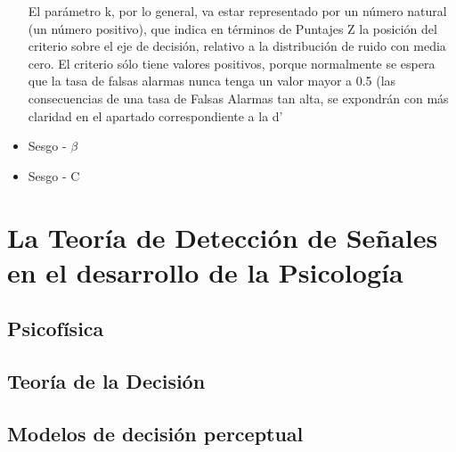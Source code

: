 \begin{itemize}
 El parámetro k, por lo general, va estar representado por un número natural (un número positivo), que indica en términos de Puntajes Z  la posición del criterio sobre el eje de decisión, relativo a la distribución de ruido con media cero. El criterio sólo tiene valores positivos, porque normalmente se espera que la tasa de falsas alarmas nunca tenga un valor mayor a 0.5 (las consecuencias de una tasa de Falsas Alarmas tan alta, se expondrán con más claridad en el apartado correspondiente a la d’


\item Sesgo - $\beta$


\item Sesgo - C


\end{itemize}


\section{La Teoría de Detección de Señales en el desarrollo de la Psicología}

\subsection{Psicofísica}



\subsection{Teoría de la Decisión}

\subsection{Modelos de decisión perceptual}

